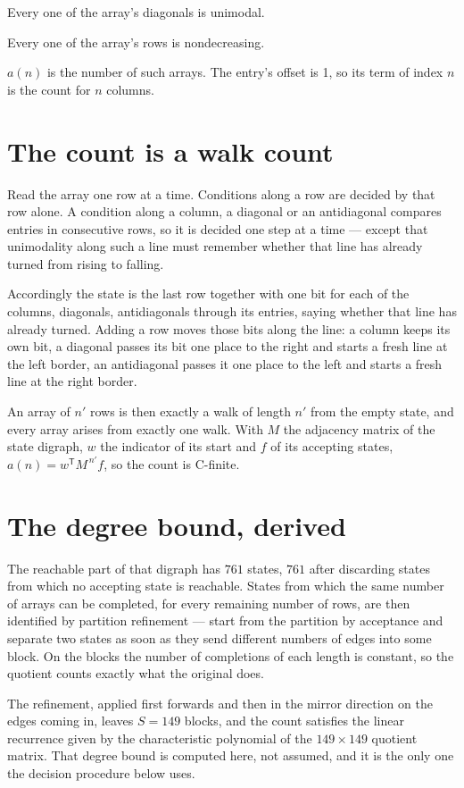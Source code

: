 \documentclass[11pt]{article}
\theoremstyle{definition}
\begin{document}
Every one of the array's diagonals is unimodal.

Every one of the array's rows is nondecreasing.

$a(n)$ is the number of such arrays. The entry's offset is 1, so its term of index $n$ is the count for $n$ columns.

\section{The count is a walk count}

Read the array one row at a time. Conditions along a row are decided by that row alone. A condition along a column, a diagonal or an antidiagonal compares entries in consecutive rows, so it is decided one step at a time --- except that unimodality along such a line must remember whether that line has already turned from rising to falling.

Accordingly the state is the last row together with one bit for each of the columns, diagonals, antidiagonals through its entries, saying whether that line has already turned. Adding a row moves those bits along the line: a column keeps its own bit, a diagonal passes its bit one place to the right and starts a fresh line at the left border, an antidiagonal passes it one place to the left and starts a fresh line at the right border.

An array of $n'$ rows is then exactly a walk of length $n'$ from the empty state, and every array arises from exactly one walk. With $M$ the adjacency matrix of the state digraph, $w$ the indicator of its start and $f$ of its accepting states, $a(n) = w^{\mathsf T}M^{\,n'}f$, so the count is C-finite.

\section{The degree bound, derived}

The reachable part of that digraph has $761$ states, $761$ after discarding states from which no accepting state is reachable. States from which the same number of arrays can be completed, for every remaining number of rows, are then identified by partition refinement --- start from the partition by acceptance and separate two states as soon as they send different numbers of edges into some block. On the blocks the number of completions of each length is constant, so the quotient counts exactly what the original does.

The refinement, applied first forwards and then in the mirror direction on the edges coming in, leaves $S = 149$ blocks, and the count satisfies the linear recurrence given by the characteristic polynomial of the $149 \times 149$ quotient matrix. That degree bound is computed here, not assumed, and it is the only one the decision procedure below uses.
\end{document}
